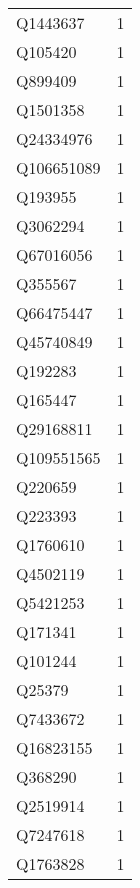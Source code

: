 \begin{tabular}{lr}
    Q1443637 &                             1 \\
     Q105420 &                             1 \\
     Q899409 &                             1 \\
    Q1501358 &                             1 \\
   Q24334976 &                             1 \\
  Q106651089 &                             1 \\
     Q193955 &                             1 \\
    Q3062294 &                             1 \\
   Q67016056 &                             1 \\
     Q355567 &                             1 \\
   Q66475447 &                             1 \\
   Q45740849 &                             1 \\
     Q192283 &                             1 \\
     Q165447 &                             1 \\
   Q29168811 &                             1 \\
  Q109551565 &                             1 \\
     Q220659 &                             1 \\
     Q223393 &                             1 \\
    Q1760610 &                             1 \\
    Q4502119 &                             1 \\
    Q5421253 &                             1 \\
     Q171341 &                             1 \\
     Q101244 &                             1 \\
      Q25379 &                             1 \\
    Q7433672 &                             1 \\
   Q16823155 &                             1 \\
     Q368290 &                             1 \\
    Q2519914 &                             1 \\
    Q7247618 &                             1 \\
    Q1763828 &                             1 \\

\end{tabular}
